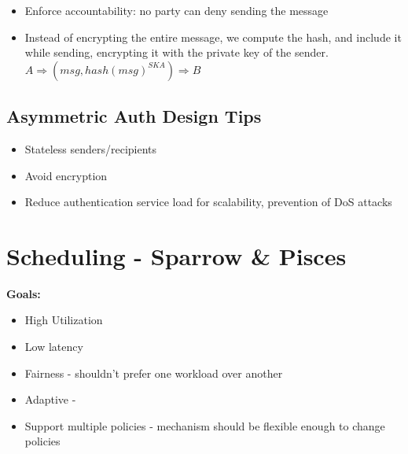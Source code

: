 \documentclass[parskip=half]{scrartcl}
\begin{document}
        \begin{itemize}
            \item 
            Enforce accountability: no party can deny sending the message
            \item 
            Instead of encrypting the entire message, we compute the hash, and include it while sending, encrypting it with the private key of the sender.\\
            $A \Rightarrow (msg, {hash(msg)}^{SKA}) \Rightarrow B$
        \end{itemize}
    

    \subsection{Asymmetric Auth Design Tips} %
    \label{sub:asymmetric_auth_design_tips}

        \begin{itemize}
            \item 
            Stateless senders/recipients
            \item 
            Avoid encryption
            \item 
            Reduce authentication service load for scalability, prevention of DoS attacks
        \end{itemize}
    



\newpage



\section{Scheduling - Sparrow \& Pisces} %
\label{sec:scheduling}

    \textbf{Goals:}
    \begin{itemize}
        \item 
        High Utilization
        \item 
        Low latency
        \item 
        Fairness - shouldn't prefer one workload over another
        \item 
        Adaptive - 
        \item 
        Support multiple policies - mechanism should be flexible enough to change policies
    \end{itemize}
\end{document}
